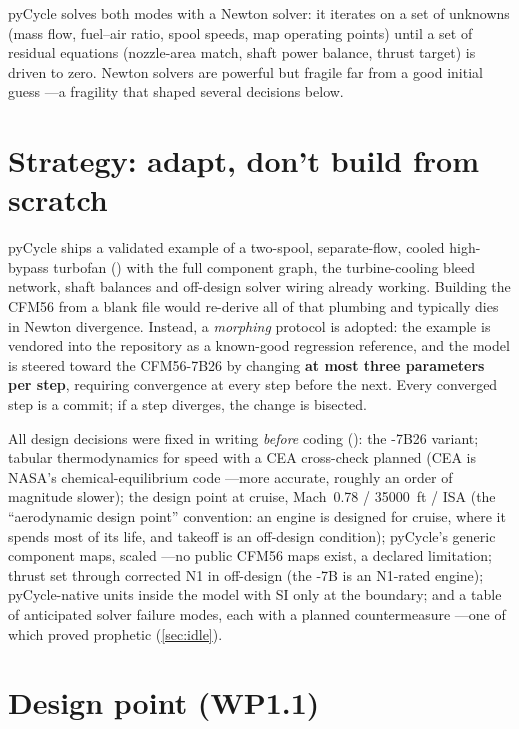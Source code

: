 pyCycle solves both modes with a Newton solver: it iterates on a set of unknowns (mass flow,
fuel--air ratio, spool speeds, map operating points) until a set of residual equations
(nozzle-area match, shaft power balance, thrust target) is driven to zero. Newton solvers are
powerful but fragile far from a good initial guess ---a fragility that shaped several decisions
below.

\section{Strategy: adapt, don't build from scratch}
\label{sec:morph}

pyCycle ships a validated example of a two-spool, separate-flow, cooled high-bypass turbofan
() with the full component graph, the turbine-cooling bleed
network, shaft balances and off-design solver wiring already working. Building the CFM56 from a
blank file would re-derive all of that plumbing and typically dies in Newton divergence.
Instead, a \emph{morphing} protocol is adopted: the example is vendored into the repository as
a known-good regression reference, and the model is steered toward the CFM56-7B26 by changing
\textbf{at most three parameters per step}, requiring convergence at every step before the
next. Every converged step is a commit; if a step diverges, the change is bisected.

All design decisions were fixed in writing \emph{before} coding ():
the -7B26 variant; tabular thermodynamics for speed with a CEA cross-check planned (CEA is
NASA's chemical-equilibrium code ---more accurate, roughly an order of magnitude slower); the
design point at cruise, Mach~0.78 / \SI{35000}{ft} / ISA (the ``aerodynamic design point''
convention: an engine is designed for cruise, where it spends most of its life, and takeoff is
an off-design condition); pyCycle's generic component maps, scaled ---no public CFM56 maps
exist, a declared limitation; thrust set through corrected N1 in off-design (the -7B is an
N1-rated engine); pyCycle-native units inside the model with SI only at the boundary; and a
table of anticipated solver failure modes, each with a planned countermeasure ---one of which
proved prophetic (\cref{sec:idle}).

\section{Design point (WP1.1)}
\label{sec:design}

